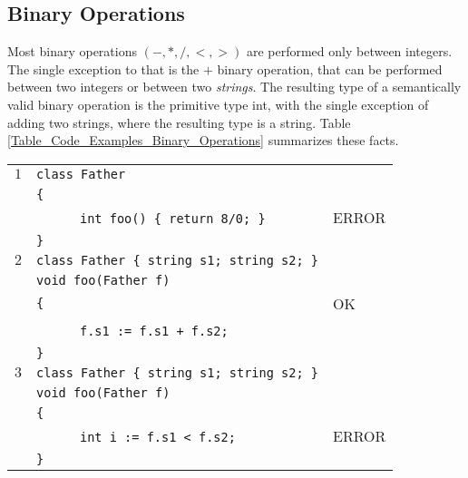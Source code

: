 \documentclass{article}
\begin{document}
\subsection{Binary Operations}
\label{subsection_Binary_Operations}
Most binary operations $(-,*,/,<,>)$ are performed only between integers.
The single exception to that is the $+$ binary operation,
that can be performed between two integers or between two \textit{strings}.
The resulting type of a semantically valid binary operation is the primitive type int,
with the single exception of adding two strings, where the resulting type is a string.
Table \ref{Table_Code_Examples_Binary_Operations} summarizes these facts.
\begin{table}[h]
\centering
\begin{tabular}{|l|l|l|}
\hline
 $1$ & \verb"class Father"                     &    \\
     & \verb"{"                                &    \\
     & ~ ~ ~ ~\verb"int foo() { return 8/0; }" & ERROR \\
     & \verb"}"                                &    \\
\hline
 $2$ & \verb"class Father { string s1; string s2; }" &    \\
     & \verb"void foo(Father f)"                     &    \\
     & \verb"{"                                      & OK \\
     & ~ ~ ~ ~\verb"f.s1 := f.s1 + f.s2;"            &    \\
     & \verb"}"                                      &    \\
\hline
 $3$ & \verb"class Father { string s1; string s2; }" &       \\
     & \verb"void foo(Father f)"                     &       \\
     & \verb"{"                                      &       \\
     & ~ ~ ~ ~\verb"int i := f.s1 < f.s2;"           & ERROR \\
     & \verb"}"                                      &       \\

\end{tabular}
\end{table}
\end{document}
